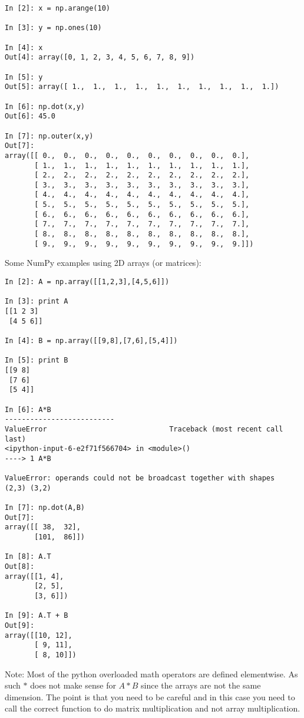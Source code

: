 \begin{verbatim}
In [2]: x = np.arange(10)

In [3]: y = np.ones(10)

In [4]: x
Out[4]: array([0, 1, 2, 3, 4, 5, 6, 7, 8, 9])

In [5]: y
Out[5]: array([ 1.,  1.,  1.,  1.,  1.,  1.,  1.,  1.,  1.,  1.])

In [6]: np.dot(x,y)
Out[6]: 45.0

In [7]: np.outer(x,y)
Out[7]:
array([[ 0.,  0.,  0.,  0.,  0.,  0.,  0.,  0.,  0.,  0.],
       [ 1.,  1.,  1.,  1.,  1.,  1.,  1.,  1.,  1.,  1.],
       [ 2.,  2.,  2.,  2.,  2.,  2.,  2.,  2.,  2.,  2.],
       [ 3.,  3.,  3.,  3.,  3.,  3.,  3.,  3.,  3.,  3.],
       [ 4.,  4.,  4.,  4.,  4.,  4.,  4.,  4.,  4.,  4.],
       [ 5.,  5.,  5.,  5.,  5.,  5.,  5.,  5.,  5.,  5.],
       [ 6.,  6.,  6.,  6.,  6.,  6.,  6.,  6.,  6.,  6.],
       [ 7.,  7.,  7.,  7.,  7.,  7.,  7.,  7.,  7.,  7.],
       [ 8.,  8.,  8.,  8.,  8.,  8.,  8.,  8.,  8.,  8.],
       [ 9.,  9.,  9.,  9.,  9.,  9.,  9.,  9.,  9.,  9.]])
\end{verbatim}

Some NumPy examples using 2D arrays (or matrices):

\begin{verbatim}
In [2]: A = np.array([[1,2,3],[4,5,6]])

In [3]: print A
[[1 2 3]
 [4 5 6]]

In [4]: B = np.array([[9,8],[7,6],[5,4]])

In [5]: print B
[[9 8]
 [7 6]
 [5 4]]

In [6]: A*B
--------------------------
ValueError                             Traceback (most recent call last)
<ipython-input-6-e2f71f566704> in <module>()
----> 1 A*B

ValueError: operands could not be broadcast together with shapes
(2,3) (3,2)

In [7]: np.dot(A,B)
Out[7]:
array([[ 38,  32],
       [101,  86]])

In [8]: A.T
Out[8]:
array([[1, 4],
       [2, 5],
       [3, 6]])

In [9]: A.T + B
Out[9]:
array([[10, 12],
       [ 9, 11],
       [ 8, 10]])
\end{verbatim}

Note: Most of the python overloaded math operators are defined
elementwise. As such \(*\) does not make sense for \(A*B\) since the
arrays are not the same dimension. The point is that you need to be
careful and in this case you need to call the correct function to do
matrix multiplication and not array multiplication.

